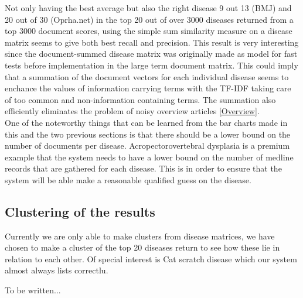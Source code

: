 Not only having the best average but also the right disease 9 out 13 (BMJ) and 20 out of 30 (Oprha.net) in the top 20 out of over 3000 diseases returned from a top 3000 document scores, using the simple sum similarity measure on a disease matrix seems to give both best recall and precision. This result is very interesting since the document-summed disease matrix was originally made as model for fast tests before implementation in the large term document matrix. This could imply that a summation of the document vectors for each individual disease seems to enchance the values of information carrying terms with the TF-IDF taking care of too common and non-information containing terms. The summation also efficiently eliminates the problem of noisy overview articles \ref{Overview}. \\

One of the noteworthy things that can be learned from the bar charts made in this and the two previous sections is that there should be a lower bound on the number of documents per disease. Acropectorovertebral dysplasia is a premium example that the system needs to have a lower bound on the number of medline records that are gathered for each disease. This is in order to ensure that the system will be able make a reasonable qualified guess on the disease.

\subsection{Clustering of the results}
Currently we are only able to make clusters from disease matrices, we have chosen to make a cluster of the top 20 diseases return to see how these lie in relation to each other. Of special interest is Cat scratch disease which our system almost always lists correctlu. %



To be written...

